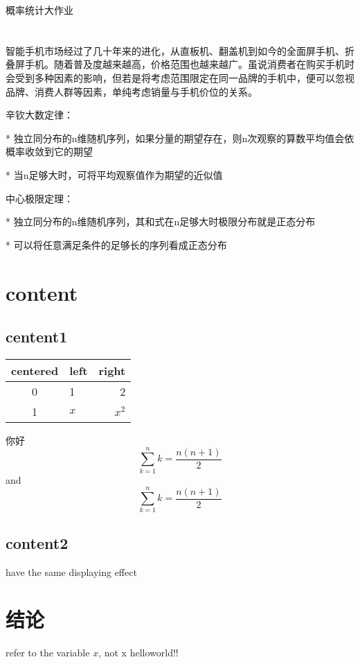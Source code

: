 \documentclass[12pt]{ctexart}
\begin{document}
\begin{center}
\large 概率统计大作业
\end{center}

\section{}

智能手机市场经过了几十年来的进化，从直板机、翻盖机到如今的全面屏手机、折叠屏手机。随着普及度越来越高，价格范围也越来越广。虽说消费者在购买手机时会受到多种因素的影响，但若是将考虑范围限定在同一品牌的手机中，便可以忽视品牌、消费人群等因素，单纯考虑销量与手机价位的关系。

辛钦大数定律：

    * 独立同分布的n维随机序列，如果分量的期望存在，则n次观察的算数平均值会依概率收敛到它的期望
    
    * 当n足够大时，可将平均观察值作为期望的近似值

    中心极限定理：

    * 独立同分布的n维随机序列，其和式在n足够大时极限分布就是正态分布

    * 可以将任意满足条件的足够长的序列看成正态分布
\section{content}
\subsection{centent1}

\begin{tabular}{|c|lr|}
\hline
centered & left & right \\
\hline
0&1&2\\
1&$x$&$x^2$\\
\hline
\end{tabular}


你好
\[ \sum_{k=1}^n k = \frac{n(n+1)}{2} \] 
and $$\sum_{k=1}^n k = \frac{n(n+1)}{2}$$ 

\subsection{content2}
have the same displaying effect

\section{结论}

\begin{center}
refer to the variable $x$, not x
helloworld!!
\end{center}
\end{document}
